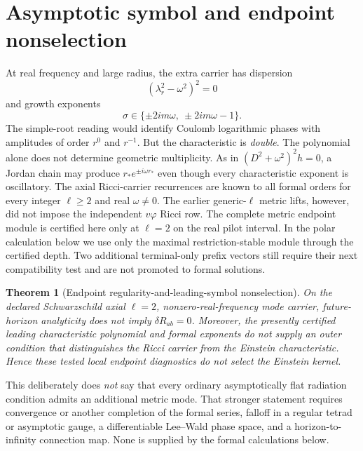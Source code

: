\documentclass[11pt]{article}
\newtheorem{theorem}{Theorem}[section]
\theoremstyle{definition}
\theoremstyle{remark}
\begin{document}
\section{Asymptotic symbol and endpoint nonselection}

At real frequency and large radius, the extra carrier has dispersion
\begin{equation}
 (\lambda_r^2-\omega^2)^2=0
\end{equation}
and growth exponents
\begin{equation}
 \sigma\in\{\pm2im\omega,\ \pm2im\omega-1\}.
\end{equation}
The simple-root reading would identify Coulomb logarithmic phases with
amplitudes of order \(r^0\) and \(r^{-1}\).  But the characteristic is
\emph{double}.  The polynomial alone does not determine geometric
multiplicity.  As in \((D^2+\omega^2)^2h=0\), a Jordan chain may produce
\(r_*e^{\pm i\omega r_*}\) even though every characteristic exponent is
oscillatory.  The axial Ricci-carrier recurrences are known to all formal
orders for every integer \(\ell\ge2\) and real \(\omega\ne0\).  The earlier
generic-\(\ell\) metric lifts, however, did not impose the independent
\(v\varphi\) Ricci row.  The complete metric endpoint module is certified
here only at \(\ell=2\) on the real pilot interval.  In the polar calculation
below we use only the maximal
restriction-stable module through the certified depth.  Two additional
terminal-only prefix vectors still require their next compatibility test and
are not promoted to formal solutions.

\begin{theorem}[Endpoint regularity-and-leading-symbol nonselection]
On the declared Schwarzschild axial \(\ell=2\), nonzero-real-frequency mode
carrier, future-horizon analyticity does not imply \(\delta R_{ab}=0\).
Moreover, the presently certified leading characteristic polynomial and
formal exponents do not supply an outer condition that distinguishes the
Ricci carrier from the Einstein characteristic.  Hence these tested local
endpoint diagnostics do not select the Einstein kernel.
\end{theorem}

This deliberately does \emph{not} say that every ordinary asymptotically
flat radiation condition admits an additional metric mode.  That stronger
statement requires convergence or another completion of the formal series,
falloff in a regular tetrad or asymptotic gauge, a differentiable
Lee--Wald phase space, and a horizon-to-infinity connection map.  None is
supplied by the formal calculations below.
\end{document}
